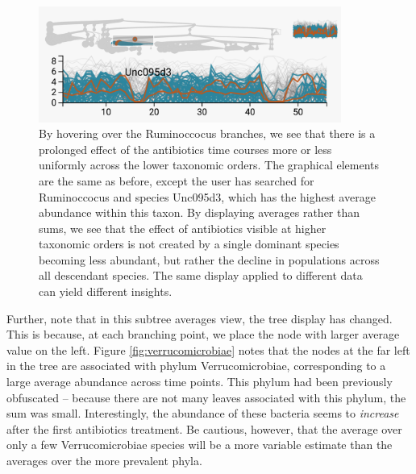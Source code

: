 \begin{figure}

{\centering \includegraphics[width=375px]{figure/treelapse/ruminococcus}

}

\caption{By hovering over the Ruminoccocus branches, we see that there is a
  prolonged effect of the antibiotics time courses more or less uniformly across
  the lower taxonomic orders. The graphical elements are the same as before,
  except the user has searched for Ruminoccocus and species Unc095d3, which has
  the highest average abundance within this taxon. By displaying averages rather
  than sums, we see that the effect of antibiotics visible at higher taxonomic
  orders is not created by a single dominant species becoming less abundant, but
  rather the decline in populations across all descendant species. The same
  display applied to different data can yield different
  insights.}\label{fig:ruminococcus}
\end{figure}

Further, note that in this subtree averages view, the tree display has changed.
This is because, at each branching point, we place the node with larger average
value on the left. Figure \ref{fig:verrucomicrobiae} notes that the nodes at
the far left in the tree are associated with phylum Verrucomicrobiae,
corresponding to a large average abundance across time points. This phylum had
been previously obfuscated -- because there are not many leaves associated with
this phylum, the sum was small. Interestingly, the abundance of these bacteria
seems to \emph{increase} after the first antibiotics treatment. Be cautious,
however, that the average over only a few Verrucomicrobiae species will be a
more variable estimate than the averages over the more prevalent phyla.

